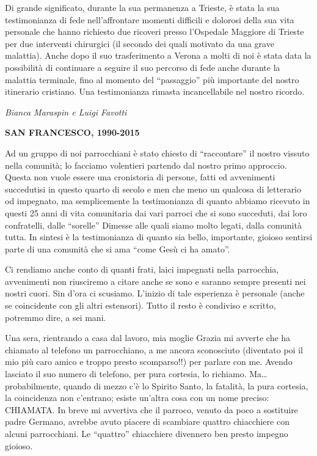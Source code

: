 Di grande significato, durante la sua permanenza a Trieste, è stata la sua testimonianza di 
fede nell’affrontare momenti difficili e dolorosi della sua vita personale che hanno richiesto due 
ricoveri presso l’Ospedale Maggiore di Trieste per due interventi chirurgici (il secondo dei quali 
motivato da una grave malattia).  Anche dopo il suo trasferimento a Verona  a molti di noi è stata 
data la possibilità di continuare a seguire il suo percorso di fede anche durante la malattia terminale, 
fino al momento del “passaggio” più importante del nostro itinerario cristiano. Una testimonianza  
rimasta incancellabile nel nostro ricordo.
\begin{flushright}
\textit{Bianca Maraspin e Luigi Favotti}
\end{flushright}
\bigskip
\begin{center}
\textbf{\Large SAN FRANCESCO, 1990-2015}
\end{center}
\bigbreak
Ad un gruppo di noi parrocchiani è stato chiesto di “raccontare” il nostro vissuto nella
comunità; lo facciamo volentieri partendo dal nostro primo approccio.
Questa non vuole essere una cronistoria di persone, fatti ed avvenimenti succedutisi in questo 
quarto di secolo e men che meno un qualcosa di letterario od impegnato, ma semplicemente  la 
testimonianza di quanto abbiamo ricevuto in questi 25 anni di vita comunitaria dai vari parroci che 
si sono succeduti, dai loro confratelli, dalle “sorelle” Dimesse alle quali siamo molto legati, dalla 
comunità tutta. In sintesi è la testimonianza di quanto sia bello, importante, gioioso sentirsi parte di 
una comunità che si ama “come Gesù ci ha amato”.

Ci rendiamo anche conto di quanti frati, laici impegnati nella parrocchia, avvenimenti non 
riusciremo a citare anche se sono e saranno sempre presenti nei nostri cuori. Sin d’ora ci scusiamo.
L’inizio di tale esperienza è personale (anche se coincidente con gli altri estensori). Tutto il resto è 
condiviso e scritto, potremmo dire, a sei mani.

Una sera, rientrando a casa dal lavoro, mia moglie Grazia mi avverte che ha chiamato al 
telefono un parrocchiano, a me ancora sconosciuto (diventato poi il mio più caro amico e troppo 
presto scomparso!!) per parlare con me. Avendo lasciato il suo numero di telefono, per pura 
cortesia, lo richiamo. Ma…probabilmente, quando di mezzo c’è lo Spirito Santo, la fatalità, la pura 
cortesia, la coincidenza non c’entrano; esiste un’altra cosa con un nome preciso: CHIAMATA.
In breve mi avvertiva che il parroco, venuto da poco a sostituire padre Germano, avrebbe avuto 
piacere di scambiare quattro chiacchiere con alcuni parrocchiani. Le “quattro” chiacchiere 
divennero ben presto impegno gioioso.


